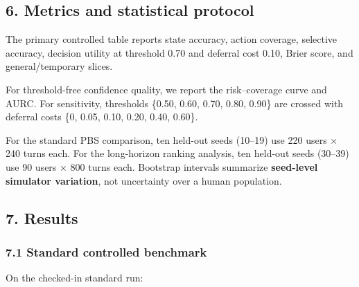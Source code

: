 \subsection{6. Metrics and statistical
protocol}\label{metrics-and-statistical-protocol}

The primary controlled table reports state accuracy, action coverage,
selective accuracy, decision utility at threshold 0.70 and deferral cost
0.10, Brier score, and general/temporary slices.

For threshold-free confidence quality, we report the risk--coverage
curve and AURC. For sensitivity, thresholds \{0.50, 0.60, 0.70, 0.80,
0.90\} are crossed with deferral costs \{0, 0.05, 0.10, 0.20, 0.40,
0.60\}.

For the standard PBS comparison, ten held-out seeds (10--19) use 220
users × 240 turns each. For the long-horizon ranking analysis, ten
held-out seeds (30--39) use 90 users × 800 turns each. Bootstrap
intervals summarize \textbf{seed-level simulator variation}, not
uncertainty over a human population.

\subsection{7. Results}\label{results}

\subsubsection{7.1 Standard controlled
benchmark}\label{standard-controlled-benchmark}

On the checked-in standard run:

